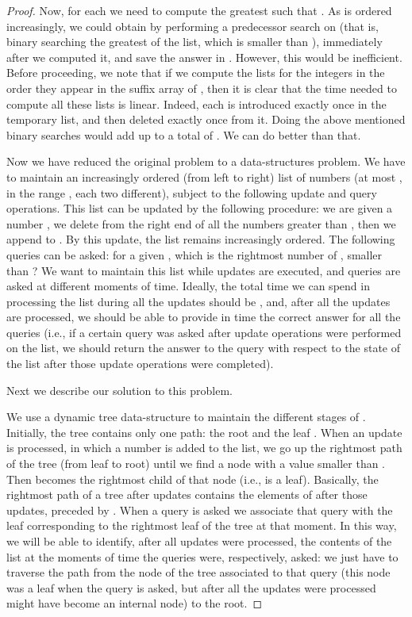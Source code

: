 \documentclass[final]{dmtcs-episciences}
\begin{document}
\begin{proof}
Now, for each  we need to compute the greatest  such that . As  is ordered increasingly, we could obtain  by performing a predecessor search on  (that is, binary searching the greatest  of the list, which is smaller than ), immediately after we computed it, and save the answer in . However, this would be inefficient. Before proceeding, we note that if we compute the lists  for the integers  in the order they appear in the suffix array of , then it is clear that the time needed to compute all these lists is linear. Indeed, each  is introduced exactly once in the temporary list, and then deleted exactly once from it. Doing the above mentioned binary searches would add up to a total of . We can do better than that.

Now we have reduced the original problem to a data-structures problem. We have to maintain an increasingly ordered (from left to right) list  of numbers (at most , in the range , each two different), subject to the following update and query operations. This list can be updated by the following procedure: we are given a number , we delete from the right end of  all the numbers greater than , then we append  to . By this update, the list remains increasingly ordered.  The following queries can be asked: for a given , which is the rightmost number of , smaller than ? 
We want to maintain this list while  updates are executed, and  queries are asked at different moments of time. 
Ideally, the total time we can spend in processing the list during all the updates should be , and, after all the updates are processed, we should be able to provide in  time the correct answer for all the queries (i.e., if a certain query was asked after  update operations were performed on the list, we should return the answer to the query with respect to the state of the list after those  update operations were completed).

Next we describe our solution to this problem.

We use a dynamic tree data-structure to maintain the different stages of . Initially, the tree contains only one path: the root  and the leaf . When an update is processed, in which a number  is added to the list, we go up the rightmost path of the tree (from leaf to root) until we find a node with a value smaller than . Then  becomes the rightmost child of that node (i.e.,  is a leaf). Basically, the rightmost path of a tree after  updates contains the elements of  after those  updates, preceded by . When a query is asked we associate that query with the leaf corresponding to the rightmost leaf of the tree at that moment. In this way, we will be able to identify, after all updates were processed, the contents of the list at the moments of time the queries were, respectively, asked: we just have to traverse the path from the node of the tree associated to that query (this node was a leaf when the query is asked, but after all the updates were processed might have become an internal node) to the root.


\end{proof}
\end{document}
